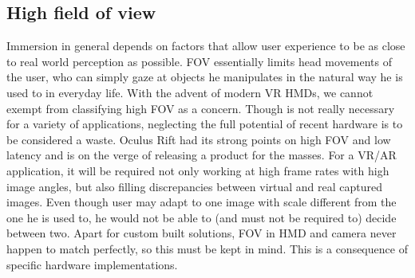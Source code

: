 \subsection{High field of view}
Immersion in general depends on factors that allow user experience to be as close to real world perception as possible. FOV essentially limits head movements of the user, who can simply gaze at objects he manipulates in the natural way he is used to in everyday life. With the advent of modern VR HMDs, we cannot exempt from classifying high FOV as a concern. Though is not really necessary for a variety of applications, neglecting the full potential of recent hardware is to be considered a waste. Oculus Rift had its strong points on high FOV and low latency and is on the verge of releasing a product for the masses. For a VR/AR application, it will be required not only working at high frame rates with high image angles, but also filling discrepancies between virtual and real captured images. Even though user may adapt to one image with scale different from the one he is used to, he would not be able to (and must not be required to) decide between two. Apart for custom built solutions, FOV in HMD and camera never happen to match perfectly, so this must be kept in mind. This is a consequence of specific hardware implementations.

